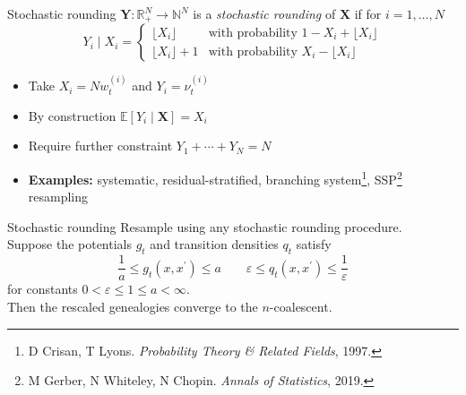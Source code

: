 \documentclass[aspectratio=169]{beamer}
\theoremstyle{definition}
\newcommand{\E}{\mathbb{E}}
\newcommand{\vt}[2][t]{\nu_{#1}^{(#2)}}
\newcommand{\wt}[2][t]{w_{#1}^{(#2)}}
\begin{document}
\begin{frame}{Stochastic rounding}
$\mathbf{Y}: \mathbb{R}_+^N \to \mathbb{N}^N$ is a \emph{stochastic rounding} of $\mathbf{X}$ if for $i=1,\dots,N$
\begin{equation*}
Y_i \mid X_i =
\begin{cases}
 \lfloor X_i \rfloor & \text{with probability } 1- X_i + \lfloor X_i \rfloor \\
  \lfloor X_i \rfloor +1 & \text{with probability } X_i - \lfloor X_i \rfloor 
\end{cases}
\end{equation*}
\begin{itemize}
\item Take $X_i = N\wt{i}$ and $Y_i = \vt{i}$
\item By construction $\E[Y_i \mid \mathbf{X}] = X_i$
\item Require further constraint $Y_1 + \cdots + Y_N = N$
\item \textbf{Examples:} systematic, residual-stratified, branching system\footnote{D Crisan, T Lyons. \textit{Probability Theory \& Related Fields}, 1997.}, SSP\footnote{M Gerber, N Whiteley, N Chopin. \textit{Annals of Statistics}, 2019.} resampling
\end{itemize}
\end{frame}


\begin{frame}{Stochastic rounding}
Resample using any stochastic rounding procedure.\\[10pt]
Suppose the potentials $g_t$ and transition densities $q_t$ satisfy
\begin{equation*}
\frac{1}{a} \leq g_t(x, x^\prime) \leq a \qquad
\varepsilon \leq q_t(x, x^\prime) \leq \frac{1}{\varepsilon} 
\end{equation*}
for constants $0<\varepsilon\leq 1\leq a<\infty$.\\[10pt]
Then the rescaled genealogies converge to the $n$-coalescent.
\end{frame}
\end{document}
